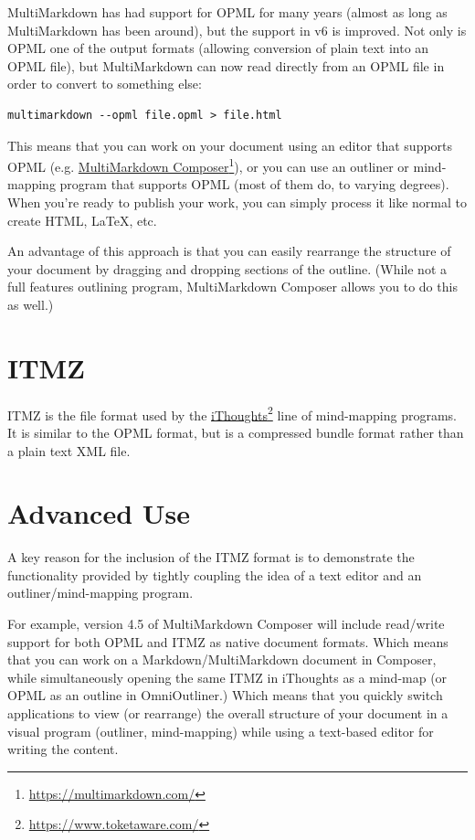 MultiMarkdown has had support for OPML for many years (almost as long as MultiMarkdown has been around), but the support in v6 is improved. Not only is OPML one of the output formats (allowing conversion of plain text into an OPML file), but MultiMarkdown can now read directly from an OPML file in order to convert to something else:

\begin{verbatim}
multimarkdown --opml file.opml > file.html
\end{verbatim}

This means that you can work on your document using an editor that supports OPML (e.g. \href{https://multimarkdown.com/}{MultiMarkdown Composer}\footnote{\href{https://multimarkdown.com/}{https:\slash \slash multimarkdown.com\slash }}), or you can use an outliner or mind-mapping program that supports OPML (most of them do, to varying degrees). When you're ready to publish your work, you can simply process it like normal to create HTML, LaTeX, etc.

An advantage of this approach is that you can easily rearrange the structure of your document by dragging and dropping sections of the outline. (While not a full features outlining program, MultiMarkdown Composer allows you to do this as well.)

\section{ITMZ}
\label{itmz}

ITMZ is the file format used by the \href{https://www.toketaware.com/}{iThoughts}\footnote{\href{https://www.toketaware.com/}{https:\slash \slash www.toketaware.com\slash }} line of mind-mapping programs. It is similar to the OPML format, but is a compressed bundle format rather than a plain text XML file.

\section{Advanced Use}
\label{advanceduse}

A key reason for the inclusion of the ITMZ format is to demonstrate the functionality provided by tightly coupling the idea of a text editor and an outliner\slash mind-mapping program.

For example, version 4.5 of MultiMarkdown Composer will include read\slash write support for both OPML and ITMZ as native document formats. Which means that you can work on a Markdown\slash MultiMarkdown document in Composer, while simultaneously opening the same ITMZ in iThoughts as a mind-map (or OPML as an outline in OmniOutliner.) Which means that you quickly switch applications to view (or rearrange) the overall structure of your document in a visual program (outliner, mind-mapping) while using a text-based editor for writing the content.

